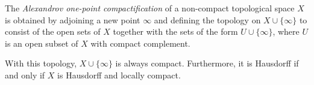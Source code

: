 \documentclass[12pt]{article}
\begin{document}

The \emph{Alexandrov one-point compactification} of a non-compact topological space $X$ is obtained by adjoining a new point $\infty$ and defining the topology on $X\cup\{\infty\}$ to consist of the open sets of $X$ together with the sets of the form $U\cup\{\infty\}$, where $U$ is an open subset of $X$ with compact complement.

With this topology, $X\cup\{\infty\}$ is always compact.
Furthermore, it is Hausdorff if and only if $X$ is Hausdorff and locally compact.
\end{document}
